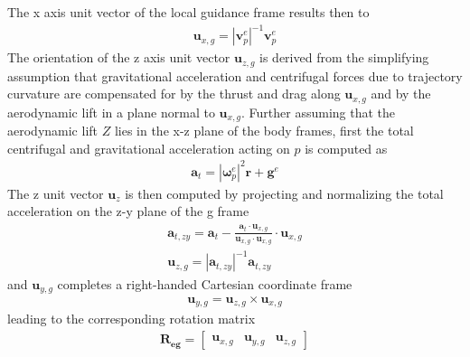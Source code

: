 \documentclass{ifacconf}
\newcommand{\mbf}[1]{\mathbf{#1}}
\providecommand{\mbf}[1]{\mathbf{#1}}
\newcommand{\Reg}{{\ensuremath{\mbf{R_{e  g}}}}}
\begin{document}
The x axis unit vector of the local guidance frame results then to
\begin{align}
\mbf{u}_{x,g} = |\mbf{v}_p^e|^{-1}\mbf{v}_p^e
\end{align}
The orientation of the z axis unit vector $\mbf{u}_{z,g}$ is derived from the simplifying assumption that gravitational acceleration and centrifugal forces due to trajectory curvature are compensated for by the thrust and drag along $\mbf{u}_{x,g}$ and by the aerodynamic lift in a plane normal to $\mbf{u}_{x,g}$. Further assuming that the aerodynamic lift $Z$ lies in the x-z plane of the body frames, first the total centrifugal and gravitational acceleration acting on $p$ is computed as
\begin{align}
\mbf{a}_{t} = |\mbf{\omega}^e_{p}|^2 \mbf{r} + \mbf{g}^e
\end{align}
The z unit vector $\mbf{u}_z$ is then computed by projecting and normalizing the total acceleration on the z-y plane of the g frame
\begin{align}
\mbf{a}_{t,zy} = \mbf{a}_t - \frac{\mbf{a}_t \cdot \mbf{u}_{x,g}}{\mbf{u}_{x,g} \cdot \mbf{u}_{x,g}} \cdot \mbf{u}_{x,g} \\
\mbf{u}_{z,g} = |\mbf{a}_{t,zy}|^{-1}\mbf{a}_{t,zy}
\end{align}
and $\mbf{u}_{y,g}$ completes a right-handed Cartesian coordinate frame
\begin{align}
\mbf{u}_{y,g} = \mbf{u}_{z,g} \times \mbf{u}_{x,g}
\end{align}
leading to the corresponding rotation matrix
\begin{align}
\Reg 
=
\begin{bmatrix}
\mbf{u}_{x,g} & 
\mbf{u}_{y,g} &
\mbf{u}_{z,g}
\end{bmatrix}
\end{align}
%
\end{document}
